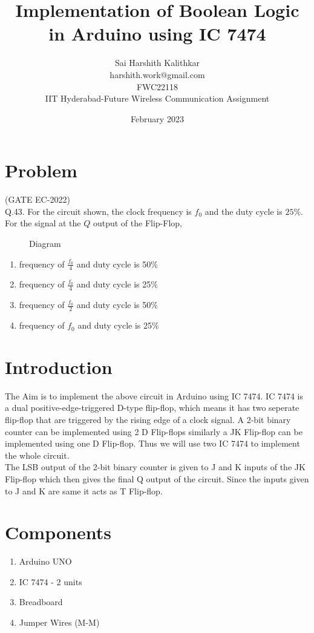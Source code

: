 \documentclass{article}
\title{Implementation of Boolean Logic in Arduino using IC 7474}
\date{February 2023}
\author{Sai Harshith Kalithkar\\harshith.work@gmail.com\\FWC22118\\IIT Hyderabad-Future Wireless Communication Assignment}
\begin{document}
\maketitle
	\tableofcontents
\pagebreak
\section{Problem}
	(GATE EC-2022)\\
	Q.43. For the circuit shown, the clock frequency is $f_0$ and the duty cycle is $25 \%$. For the signal at the $Q$ output of the Flip-Flop,
\\
\begin{figure}[H]

	\caption{Diagram}
	\label{fig:1}
\end{figure}

\begin{enumerate}
	\item frequency of $\frac{f_0}{4}$ and duty cycle is 50$\%$
	\item frequency of $\frac{f_0}{4}$ and duty cycle is 25$\%$
	\item frequency of $\frac{f_0}{2}$ and duty cycle is 50$\%$
	\item frequency of $f_0$ and duty cycle is 25$\%$ \\
\end{enumerate}

\section{Introduction}
		The Aim is to implement the above circuit in Arduino using IC 7474. IC 7474 is a dual positive-edge-triggered D-type flip-flop, which means it has two seperate flip-flop that are triggered by the rising edge of a clock signal. A 2-bit binary counter can be implemented using 2 D Flip-flops similarly a JK Flip-flop can be implemented using one D Flip-flop. Thus we will use two IC 7474 to implement the whole circuit.\\

		The LSB output of the 2-bit binary counter is given to J and K inputs of the JK Flip-flop which then gives the final Q output of the circuit. Since the inputs given to J and K are same it acts as T Flip-flop.\\
\section{Components}
	\begin{enumerate}
		\item Arduino UNO
		\item IC 7474 - 2 units
		\item Breadboard
		\item Jumper Wires (M-M) \\
	\end{enumerate}
\end{document}
